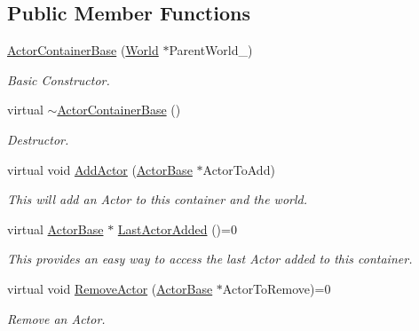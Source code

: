 \subsection*{Public Member Functions}
\begin{DoxyCompactItemize}
\item 
\hyperlink{classphys_1_1ActorContainerBase_a629529f9002646d463ea167af1d20df2}{ActorContainerBase} (\hyperlink{classphys_1_1World}{World} $\ast$ParentWorld\_\-)
\begin{DoxyCompactList}\small\item\em Basic Constructor. \item\end{DoxyCompactList}\item 
virtual \hyperlink{classphys_1_1ActorContainerBase_aa5eac062dd70a220a4ec6df973c6f258}{$\sim$ActorContainerBase} ()
\begin{DoxyCompactList}\small\item\em Destructor. \item\end{DoxyCompactList}\item 
virtual void \hyperlink{classphys_1_1ActorContainerBase_af32c2adf4c0f928604ce05e20b07ef66}{AddActor} (\hyperlink{classphys_1_1ActorBase}{ActorBase} $\ast$ActorToAdd)
\begin{DoxyCompactList}\small\item\em This will add an Actor to this container and the world. \item\end{DoxyCompactList}\item 
virtual \hyperlink{classphys_1_1ActorBase}{ActorBase} $\ast$ \hyperlink{classphys_1_1ActorContainerBase_a6ccc6d058bcbbe0b9a638e28fb136477}{LastActorAdded} ()=0
\begin{DoxyCompactList}\small\item\em This provides an easy way to access the last Actor added to this container. \item\end{DoxyCompactList}\item 
virtual void \hyperlink{classphys_1_1ActorContainerBase_a579e049a3190fcc1f951b3212c209616}{RemoveActor} (\hyperlink{classphys_1_1ActorBase}{ActorBase} $\ast$ActorToRemove)=0
\begin{DoxyCompactList}\small\item\em Remove an Actor. \item\end{DoxyCompactList}\item 

\end{DoxyCompactItemize}
